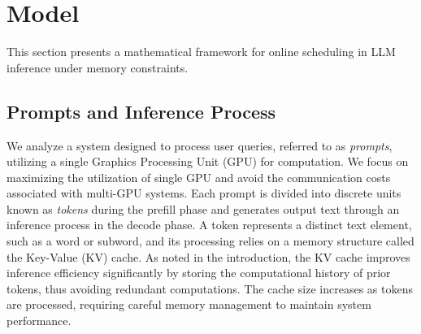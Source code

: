 \section{Model}\label{sec:model}
This section presents a mathematical framework for online scheduling in LLM inference under memory constraints. 

\subsection{Prompts and Inference Process}

We analyze a system designed to process user queries, referred to as \textit{prompts}, utilizing a single Graphics Processing Unit (GPU) for computation. We focus on maximizing the utilization of single GPU and avoid the communication costs associated with multi-GPU systems. Each prompt is divided into discrete units known as \textit{tokens} during the prefill phase and generates output text through an inference process in the decode phase. A token represents a distinct text element, such as a word or subword, and its processing relies on a memory structure called the Key-Value (KV) cache. As noted in the introduction, the KV cache improves inference efficiency significantly by storing the computational history of prior tokens, thus avoiding redundant computations. The cache size increases as tokens are processed, requiring careful memory management to maintain system performance.




